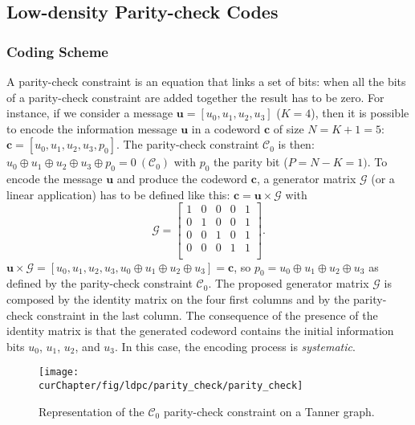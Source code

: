 \subsection{Low-density Parity-check Codes}
\label{sec:ctx_ldpc}

\subsubsection{Coding Scheme}

A parity-check constraint is an equation that links a set of bits: when all the
bits of a parity-check constraint are added together the result has to be
zero. For instance, if we consider a message $\bm{u} = [u_0, u_1, u_2, u_3]$
($K = 4$), then it is possible to encode the information message $\bm{u}$ in a
codeword $\bm{c}$ of size $N = K + 1 = 5$: $\bm{c} = [u_0,u_1,u_2,u_3,p_0]$.
The parity-check constraint $\mathcal{C}_0$ is then: $u_0 \oplus u_1 \oplus u_2
\oplus u_3 \oplus p_0 = 0~(\mathcal{C}_0)$ with $p_0$ the parity bit ($P = N -
K = 1)$. To encode the message $\bm{u}$ and produce the codeword $\bm{c}$, a
generator matrix $\bm{\mathcal{G}}$ (or a linear application) has to be defined
like this: $\bm{c} = \bm{u} \times \bm{\mathcal{G}}$ with
\begin{equation*}
\bm{\mathcal{G}} =
\begin{bmatrix}
1 & 0 & 0 & 0 & 1\\
0 & 1 & 0 & 0 & 1\\
0 & 0 & 1 & 0 & 1\\
0 & 0 & 0 & 1 & 1\\
\end{bmatrix}
.
\end{equation*}
$\bm{u} \times \bm{\mathcal{G}} = [u_0,u_1,u_2,u_3,u_0 \oplus u_1 \oplus u_2
\oplus u_3] = \bm{c}$, so $p_0 = u_0 \oplus u_1 \oplus u_2 \oplus u_3$ as
defined by the parity-check constraint $\mathcal{C}_0$. The proposed
generator matrix $\bm{\mathcal{G}}$ is composed by the identity matrix on the
four first columns and by the parity-check constraint in the last column.
The consequence of the presence of the identity matrix is that the generated
codeword contains the initial information bits $u_0$, $u_1$, $u_2$, and $u_3$.
In this case, the encoding process is \emph{systematic}.

\begin{figure}[htp]
  \centering
  \texttt{[image: \\curChapter/fig/ldpc/parity\_check/parity\_check]}
  \caption{Representation of the $\mathcal{C}_0$ parity-check constraint on a
    Tanner graph.}
  \label{fig:ctx_ldpc_parity_check}
\end{figure}

